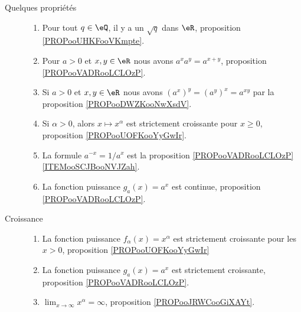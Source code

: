 \begin{description}
	\item[Quelques propriétés]
	      \begin{enumerate}
		      \item
		            Pour tout \( q\in \eQ\), il y a un \( \sqrt{ q }\) dans \( \eR\), proposition \ref{PROPooUHKFooVKmpte}.
		      \item
		            Pour \( a>0\) et \( x,y\in \eR\) nous avons \( a^xa^y=a^{x+y}\), proposition \ref{PROPooVADRooLCLOzP}.
		      \item
		            Si \( a>0\) et \( x,y\in \eR\) nous avons \( (a^x)^y=(a^y)^x=a^{xy}\) par la proposition \ref{PROPooDWZKooNwXsdV}.
		      \item
                  Si \( \alpha>0\), alors \( x\mapsto x^{\alpha}\) est strictement croissante pour \( x\geq 0\), proposition \ref{PROPooUOFKooYyGwIr}.
		      \item
		            La formule \( a^{-x}=1/a^x\) est la proposition \ref{PROPooVADRooLCLOzP}\ref{ITEMooSCJBooNVJZah}.
		      \item
		            La fonction puissance \( g_a(x)=a^x\) est continue, proposition \ref{PROPooVADRooLCLOzP}.
	      \end{enumerate}
	\item[Croissance]
	      \begin{enumerate}
		      \item
                  La fonction puissance \( f_{\alpha}(x)=x^{\alpha}\) est strictement croissante pour les \( x>0\), proposition \ref{PROPooUOFKooYyGwIr}
		      \item
		            La fonction puissance \( g_a(x)=a^x\) est strictement croissante, proposition \ref{PROPooVADRooLCLOzP}.
		      \item
		            \( \lim_{x\to \infty} x^{\alpha}=\infty\), proposition \ref{PROPooJRWCooGiXAYt}.
	      \end{enumerate}


\end{description}
